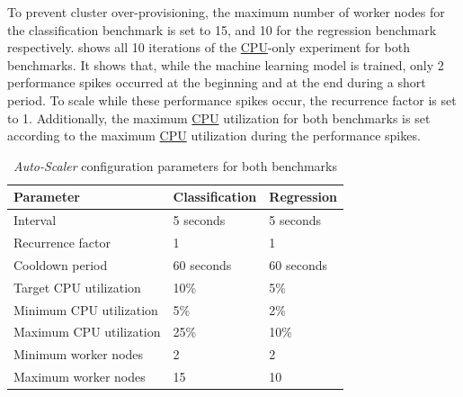 To prevent cluster over-provisioning, the maximum number of worker nodes for the classification benchmark is set to 15, and 10 for the regression benchmark respectively.
 shows all 10 iterations of the \hyperlink{abbr:cpu}{CPU}-only experiment for both benchmarks. It shows that, while the machine learning model is trained, only 2 performance spikes occurred at the beginning and at the end during a short period. To scale while these performance spikes occur, the recurrence factor is set to 1. Additionally, the maximum \hyperlink{abbr:cpu}{CPU} utilization for both benchmarks is set according to the maximum \hyperlink{abbr:cpu}{CPU} utilization during the performance spikes.
\begin{table}[ht]
\centering
\begin{tabular}{@{}l|ll@{}}
\toprule
Parameter               & Classification & Regression \\ \midrule
Interval                & 5 seconds      & 5 seconds  \\
Recurrence factor       & 1              & 1          \\
Cooldown period         & 60 seconds     & 60 seconds \\
Target CPU utilization  & 10\%           & 5\%        \\
Minimum CPU utilization & 5\%            & 2\%       \\
Maximum CPU utilization & 25\%           & 10\%       \\
Minimum worker nodes    & 2              & 2         \\
Maximum worker nodes    & 15             & 10         \\ \bottomrule
\end{tabular}
\caption{\textit{Auto-Scaler} configuration parameters for both benchmarks}
\label{table:07_auto-scaler_config_parameter}
\end{table}


